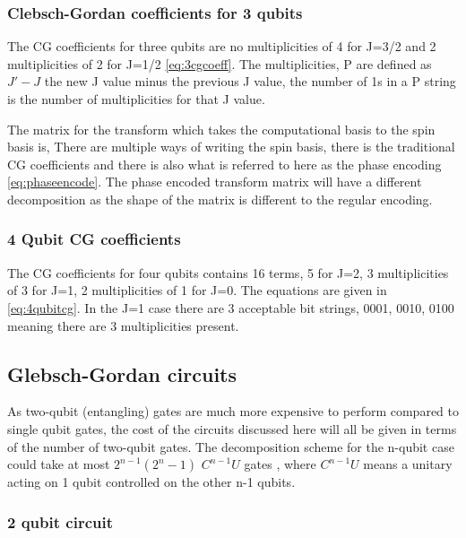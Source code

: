\documentclass[12pt]{article}
\begin{document}
\subsubsection{Clebsch-Gordan coefficients for 3 qubits}

The CG coefficients for three qubits are no multiplicities of 4 for J=3/2 and 2 multiplicities of 2 for J=1/2  \autoref{eq:3cgcoeff}. The multiplicities, P are defined as $J'-J$ the new J value minus the previous J value, the number of 1s in a P string is the number of multiplicities for that J value.


The matrix for the transform which takes the computational basis to the spin basis is,
There are multiple ways of writing the spin basis, there is the traditional CG coefficients and there is also what is referred to here as the phase encoding \autoref{eq:phaseencode}. The phase encoded transform matrix will have a different decomposition as the shape of the matrix is different to the regular encoding. 





\subsubsection{4 Qubit CG coefficients}

The CG coefficients for four qubits contains 16 terms, 5 for J=2, 3 multiplicities of 3 for J=1, 2 multiplicities of 1 for J=0. The equations are given in \autoref{eq:4qubitcg}. In the J=1 case there are 3 acceptable bit strings, 0001, 0010, 0100 meaning there are 3 multiplicities present. 

\subsection{Glebsch-Gordan circuits}

As two-qubit (entangling) gates are much more expensive to perform compared to single qubit gates, the cost of the circuits discussed here will all be given in terms of the number of two-qubit gates. The decomposition scheme for the n-qubit case could take at most $2^{n-1}(2^n-1)$ $C^{n-1}U$ gates \cite{li2013decomposition}, where $C^{n-1}U$ means a unitary acting on 1 qubit controlled on the other n-1 qubits.

\subsubsection{2 qubit circuit}
\end{document}
